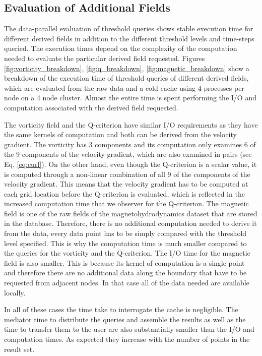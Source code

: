 \documentclass{sig-alternate}
\begin{document}
\subsection{Evaluation of Additional Fields}
The data-parallel evaluation of threshold queries shows stable execution time for different derived fields in addition to the different threshold levels and
time-steps queried. The execution times depend on the complexity of the computation needed to evaluate the particular derived field requested. Figures 
\ref{fig:vorticity_breakdown}, \ref{fig:q_breakdown}, \ref{fig:magnetic_breakdown} show a breakdown of the execution time of threshold queries of different
derived fields, which are evaluated from the raw data and a cold cache using 4 processes per node on a 4 node cluster. Almost the entire time is spent
performing the I/O and computation associated with the derived field requested. 

The vorticity field and the Q-criterion have similar I/O requirements as they
have the same kernels of computation and both can be derived from the velocity gradient. The vorticity has 3 components and its computation only examines
6 of the 9 components of the velocity gradient, which are also examined in pairs (see Eq. \ref{eq:curl}). On the other hand, even though the Q-criterion is a
scalar value, it is computed through a non-linear combination of all 9 of the components of the velocity gradient. This means that the velocity gradient has
to be computed at each grid location before the Q-criterion is evaluated, which is reflected in the increased computation time that we observer for the
Q-criterion. The magnetic field is one of the raw fields of the magnetohydrodynamics dataset that are stored in the database. Therefore, there is no
additional computation needed to derive it from the data, every data point has to be simply compared with the threshold level specified. This is why the 
computation time is much smaller compared to the queries for the vorticity and the Q-criterion. The I/O time for the magnetic field is also smaller. This is
because its kernel of computation is a single point and therefore there are no additional data along the boundary that have to be requested from adjacent 
nodes. In that case all of the data needed are available locally.

In all of these cases the time take to interrogate the cache is negligible. The mediator time to distribute the queries and assemble the results as well as the
time to transfer them to the user are also substantially smaller than the I/O and computation times. As expected they increase with the number of points in
the result set.
\end{document}
